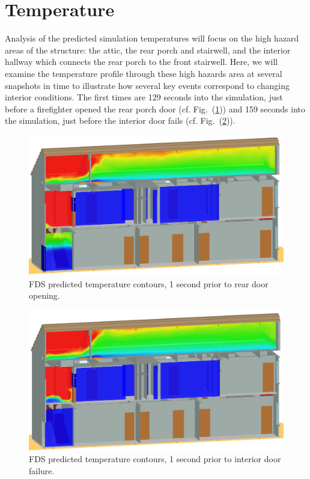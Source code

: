 \documentclass[11pt,oneside]{book}
\begin{document}
\section{Temperature}
Analysis of the predicted simulation temperatures will focus on the high hazard areas of the structure: the attic, the rear porch and stairwell, and the interior hallway which connects the rear porch to the front stairwell. Here, we will examine the temperature profile through these high hazards area at several snapshots in time to illustrate how several key events correspond to changing interior conditions. The first times are 129 seconds into the simulation, just before a firefighter opened the rear porch door (cf. Fig.~(\ref{fig:temp_129s})) and 159 seconds into the simulation, just before the interior door fails (cf. Fig.~(\ref{fig:temp_159s})).

\begin{figure}[!ht]
\includegraphics[width=.675\textwidth]{../Figures/west_50th_baseline_129}
 

\caption{FDS predicted temperature contours, 1 second prior to rear door opening.}
\label{fig:temp_129s}
\end{figure}

\begin{figure}[!ht]
\includegraphics[width=.675\textwidth]{../Figures/west_50th_baseline_159}
 

\caption{FDS predicted temperature contours, 1 second prior to interior door failure.}
\label{fig:temp_159s}
\end{figure}
\end{document}
